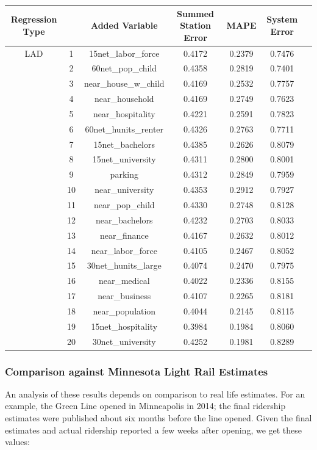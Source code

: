 \documentclass{article}
\begin{document}
\begin{center}
\begin{tabular}{ c c c c c c c }
\hline
Regression Type&&Added Variable&Summed Station Error&MAPE&System Error \\
\hline
LAD&1&15net\_labor\_force&0.4172&0.2379&0.7476\\
&2&60net\_pop\_child&0.4358&0.2819&0.7401\\
&3&near\_house\_w\_child&0.4169&0.2532&0.7757\\
&4&near\_household&0.4169&0.2749&0.7623\\
&5&near\_hospitality&0.4221&0.2591&0.7823\\
&6&60net\_hunits\_renter&0.4326&0.2763&0.7711\\
&7&15net\_bachelors&0.4385&0.2626&0.8079\\
&8&15net\_university&0.4311&0.2800&0.8001\\
&9&parking&0.4312&0.2849&0.7959\\
&10&near\_university&0.4353&0.2912&0.7927\\
&11&near\_pop\_child&0.4330&0.2748&0.8128\\
&12&near\_bachelors&0.4232&0.2703&0.8033\\
&13&near\_finance&0.4167&0.2632&0.8012\\
&14&near\_labor\_force&0.4105&0.2467&0.8052\\
&15&30net\_hunits\_large&0.4074&0.2470&0.7975\\
&16&near\_medical&0.4022&0.2336&0.8155\\
&17&near\_business&0.4107&0.2265&0.8181\\
&18&near\_population&0.4044&0.2145&0.8115\\
&19&15net\_hospitality&0.3984&0.1984&0.8060\\
&20&30net\_university&0.4252&0.1981&0.8289\\
\end{tabular}
\end{center}

\subsubsection*{Comparison against Minnesota Light Rail Estimates}

An analysis of these results depends on comparison to real life estimates. For an example, the Green Line opened in Minneapolis in 2014; the final ridership estimates were published about six months before the line opened. Given the final estimates and actual ridership reported a few weeks after opening, we get these values:
\end{document}
